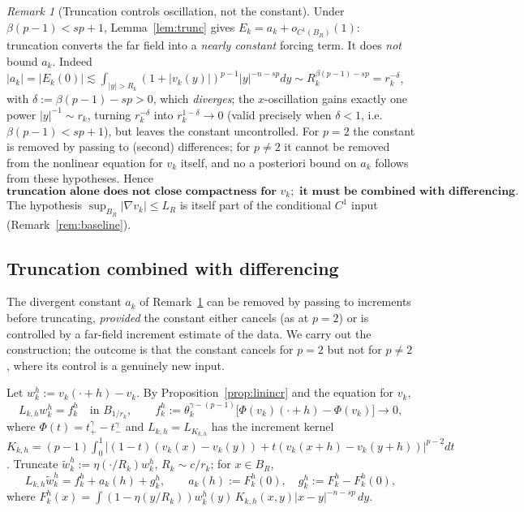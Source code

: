 \documentclass[11pt]{amsart}
\theoremstyle{plain}
\theoremstyle{definition}
\theoremstyle{remark}
\newtheorem{remark}[theorem]{Remark}
\begin{document}
\begin{remark}[Truncation controls oscillation, not the constant]\label{rem:trunc}
Under $\beta(p-1)<sp+1$, Lemma~\ref{lem:trunc} gives $E_k=a_k+o_{C^1(B_R)}(1)$:
truncation converts the far field into a \emph{nearly constant} forcing term.
It does \emph{not} bound $a_k$. Indeed
$|a_k|=|E_k(0)|\lesssim\int_{|y|>R_k}(1+|v_k(y)|)^{p-1}|y|^{-n-sp}dy\sim
R_k^{\beta(p-1)-sp}=r_k^{-\delta}$, with $\delta:=\beta(p-1)-sp>0$, which
\emph{diverges}; the $x$-oscillation gains exactly one power $|y|^{-1}\sim r_k$,
turning $r_k^{-\delta}$ into $r_k^{1-\delta}\to0$ (valid precisely when
$\delta<1$, i.e.\ $\beta(p-1)<sp+1$), but leaves the constant uncontrolled. For
$p=2$ the constant is removed by passing to (second) differences; for $p\neq2$
it cannot be removed from the nonlinear equation for $v_k$ itself, and no a
posteriori bound on $a_k$ follows from these hypotheses. Hence
\[
  \textbf{truncation alone does not close compactness for }v_k;
  \textbf{ it must be combined with differencing.}
\]
The hypothesis $\sup_{B_R}|\nabla v_k|\le L_R$ is itself part of the conditional
$C^1$ input (Remark~\ref{rem:baseline}).
\end{remark}

\subsection{Truncation combined with differencing}\label{ssec:truncdiff}
The divergent constant $a_k$ of Remark~\ref{rem:trunc} can be removed by passing
to increments before truncating, \emph{provided} the constant either cancels
(as at $p=2$) or is controlled by a far-field increment estimate of the data.
We carry out the construction; the outcome is that the constant cancels for
$p=2$ but not for $p\neq2$, where its control is a genuinely new input.

Let $w_k^h:=v_k(\cdot+h)-v_k$. By Proposition~\ref{prop:linincr} and the
equation for $v_k$,
\begin{equation}\label{eq:incr-eq-vk}
  L_{k,h}w_k^h=f_k^h\quad\text{in }B_{1/r_k},\qquad
  f_k^h:=\theta_k^{\gamma-(p-1)}\big[\Phi(v_k)(\cdot+h)-\Phi(v_k)\big]\to0,
\end{equation}
where $\Phi(t)=t_+^\gamma-t_-^\gamma$ and $L_{k,h}=L_{K_{k,h}}$ has the
increment kernel $K_{k,h}=(p-1)\int_0^1|(1-t)(v_k(x)-v_k(y))+t(v_k(x+h)-v_k(y+h))|^{p-2}dt$.
Truncate $\tilde w_k^h:=\eta(\cdot/R_k)w_k^h$, $R_k\sim c/r_k$; for $x\in B_R$,
\begin{equation}\label{eq:trunc-incr}
  L_{k,h}\tilde w_k^h=f_k^h+a_k(h)+g_k^h,\qquad
  a_k(h):=F_k^h(0),\quad g_k^h:=F_k^h-F_k^h(0),
\end{equation}
where $F_k^h(x)=\int(1-\eta(y/R_k))w_k^h(y)\,K_{k,h}(x,y)|x-y|^{-n-sp}\,dy$.
\end{document}
